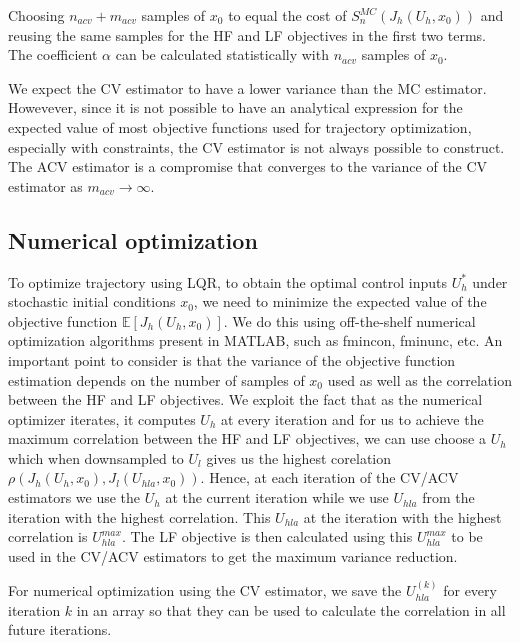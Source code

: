 \documentclass{article}
\begin{document}
Choosing $n_{acv} + m_{acv}$ samples of $x_0$ to equal the cost of $S_n^{MC}(J_h(U_h, x_0))$ and reusing the same samples
for the HF and LF objectives in the first two terms. The coefficient $\alpha$ can be calculated statistically with $n_{acv}$ samples of $x_0$.

We expect the CV estimator to have a lower variance than the MC estimator. Howevever, since it is not possible
to have an analytical expression for the expected value of most objective functions used for trajectory optimization,
especially with constraints, the CV estimator is not always possible to construct. The ACV estimator is a compromise
that converges to the variance of the CV estimator as $m_{acv} \rightarrow \infty$.

\subsection{Numerical optimization}

To optimize trajectory using LQR, to obtain the optimal control inputs $U_h^*$ under stochastic initial conditions $x_0$,
we need to minimize the expected value of the objective function $\mathbb{E}[J_h(U_h, x_0)]$. We do this using off-the-shelf
numerical optimization algorithms present in MATLAB, such as fmincon, fminunc, etc. An important point to consider
is that the variance of the objective function estimation depends on the number of samples of $x_0$ used as well as
the correlation between the HF and LF objectives. We exploit the fact that as the numerical optimizer iterates, it computes
$U_h$ at every iteration and for us to achieve the maximum correlation between the HF and LF objectives, we can use
choose a $U_h$ which when downsampled to $U_l$ gives us the highest corelation $\rho(J_h(U_h, x_0), J_l(U_{hla}, x_0))$.
Hence, at each iteration of the CV/ACV estimators we use the $U_h$ at the current iteration while we use $U_{hla}$ from
the iteration with the highest correlation. This $U_{hla}$ at the iteration with the highest correlation is
$U_{hla}^{max}$. The LF objective is then calculated using this $U_{hla}^{max}$ to be used in the CV/ACV estimators to get the maximum variance reduction.

For numerical optimization using the CV estimator, we save the $U_{hla}^{(k)}$ for every iteration $k$ in an array
so that they can be used to calculate the correlation in all future iterations.
\end{document}
